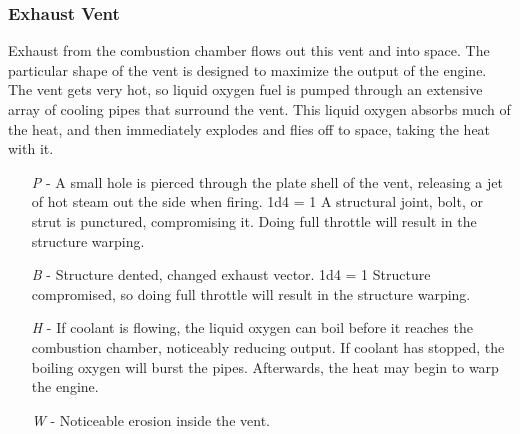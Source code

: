 \documentclass[a4paper]{article}
\begin{document}
\vspace{-0.5cm} \hspace{-18pt} \subsubsection{Exhaust Vent} \label{engine_exhaust} \vspace{-0.2cm}
Exhaust from the combustion chamber flows out this vent and into space. The particular shape of the vent is designed to maximize the output of the engine. The vent gets very hot, so liquid oxygen fuel is pumped through an extensive array of cooling pipes that surround the vent. This liquid oxygen absorbs much of the heat, and then immediately explodes and flies off to space, taking the heat with it.
\begin{enumerate}
\item [\textit{P}] - A small hole is pierced through the plate shell of the vent, releasing a jet of hot steam out the side when firing. \newline \hspace*{-3pt} 1d4 = 1 A structural joint, bolt, or strut is punctured, compromising it. Doing full throttle will result in the structure warping.
\item [\textit{B}] - Structure dented, changed exhaust vector. \newline \hspace*{3pt} 1d4 = 1 Structure compromised, so doing full throttle will result in the structure warping.
\item [\textit{H}] - If coolant is flowing, the liquid oxygen can boil before it reaches the combustion chamber, noticeably reducing output. If coolant has stopped, the boiling oxygen will burst the pipes. Afterwards, the heat may begin to warp the engine.
\item [\textit{W}] - Noticeable erosion inside the vent.
\end{enumerate}
\end{document}
